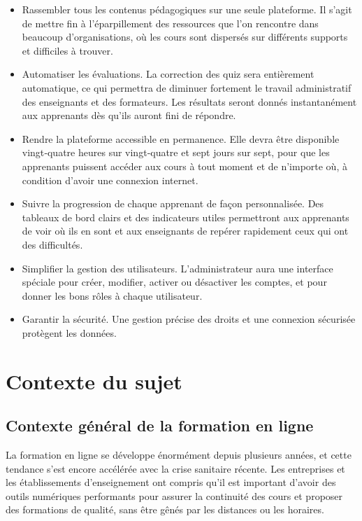 \documentclass[12pt,a4paper]{report}
\begin{document}
\begin{itemize}
    \item Rassembler tous les contenus pédagogiques sur une seule plateforme. Il s'agit de mettre fin à l'éparpillement des ressources que l'on rencontre dans beaucoup d'organisations, où les cours sont dispersés sur différents supports et difficiles à trouver.
    \item Automatiser les évaluations. La correction des quiz sera entièrement automatique, ce qui permettra de diminuer fortement le travail administratif des enseignants et des formateurs. Les résultats seront donnés instantanément aux apprenants dès qu'ils auront fini de répondre.
    \item Rendre la plateforme accessible en permanence. Elle devra être disponible vingt‑quatre heures sur vingt‑quatre et sept jours sur sept, pour que les apprenants puissent accéder aux cours à tout moment et de n'importe où, à condition d'avoir une connexion internet.
    \item Suivre la progression de chaque apprenant de façon personnalisée. Des tableaux de bord clairs et des indicateurs utiles permettront aux apprenants de voir où ils en sont et aux enseignants de repérer rapidement ceux qui ont des difficultés.
    \item Simplifier la gestion des utilisateurs. L'administrateur aura une interface spéciale pour créer, modifier, activer ou désactiver les comptes, et pour donner les bons rôles à chaque utilisateur.
    \item Garantir la sécurité. Une gestion précise des droits et une connexion sécurisée protègent les données.
\end{itemize}

\section{Contexte du sujet}
\subsection{Contexte général de la formation en ligne}
La formation en ligne se développe énormément depuis plusieurs années, et cette tendance s'est encore accélérée avec la crise sanitaire récente. Les entreprises et les établissements d'enseignement ont compris qu'il est important d'avoir des outils numériques performants pour assurer la continuité des cours et proposer des formations de qualité, sans être gênés par les distances ou les horaires.
\end{document}
